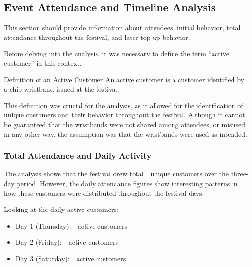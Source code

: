 
\subsection{Event Attendance and Timeline Analysis}
\label{subsec:analysis-customer-event-attendance-timeline}

This section should provide information about attendees' initial behavior, total attendance throughout the festival, and later top-up behavior.

Before delving into the analysis, it was necessary to define the term \enquote{active customer} in this context.

\begin{infobox}{Definition of an Active Customer}
	An active customer is a customer identified by a chip wristband issued at the festival.
\end{infobox}

This definition was crucial for the analysis, as it allowed for the identification of unique customers and their behavior throughout the festival.
Although it cannot be guaranteed that the wristbands were not shared among attendees, or misused in any other way, the assumption was that the wristbands were used as intended.

\pagebreak[4]


\subsubsection{Total Attendance and Daily Activity}
\label{subsubsec:analysis-total-attendance}


The analysis shows that the festival drew total~~unique customers over the three-day period.
However, the daily attendance figures show interesting patterns in how these customers were distributed throughout the festival days.

Looking at the daily active customers:
\begin{itemize}
	\item Day 1 (Thursday):~~active customers
	\item Day 2 (Friday):~~active customers
	\item Day 3 (Saturday):~~active customers
\end{itemize}

